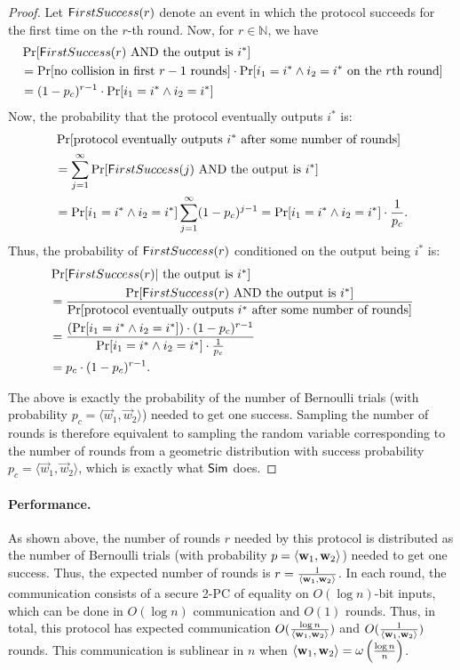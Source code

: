 \begin{proof}
Let ${\sf FirstSuccess}(r)$ denote an event in which the protocol
succeeds for the first time on the $r$-th round.  Now, for $r \in
\mathbb{N}$, we have 
%
\begin{align*}
&\Pr[{\sf FirstSuccess}(r) \mbox{ AND the output is } i^*]\\
&=
\Pr[\mbox{no collision in first } r-1 \mbox{ rounds}] \cdot \Pr[i_1 = i^* \wedge i_2 = i^* \mbox{ on the $r$th round}]\\
&= (1-p_c)^{r-1} \cdot \Pr[i_1 = i^* \wedge i_2 = i^*] 
\end{align*}
%
Now, the probability that the protocol eventually outputs $i^*$ is:
\begin{align*}
&\Pr[\mbox{protocol eventually outputs } i^* \mbox{ after some number of rounds}]\\
&= \sum_{j=1}^\infty \Pr[{\sf FirstSuccess}(j) \mbox{ AND the output is } i^*] \\ &= \Pr[i_1 = i^* \wedge i_2 = i^*]
\sum_{j=1}^\infty (1-p_c)^{j-1}
= \Pr[i_1 = i^* \wedge i_2 = i^*] \cdot \frac{1}{p_c}.
\end{align*}
Thus, the probability of ${\sf FirstSuccess}(r)$ conditioned on the
output being $i^*$ is:
\begin{align*}
&\Pr[{\sf FirstSuccess}(r) | \mbox{ the output is $i^*$}]\\
&= \frac{\Pr[{\sf FirstSuccess}(r) \mbox{ AND the output is }
i^*]}{\Pr[\mbox{protocol eventually outputs } i^* \mbox{ after some number of rounds}]}\\
&= \frac{(\Pr[i_1 = i^* \wedge i_2 = i^*]) \cdot (1-p_c)^{r-1}}{\Pr[i_1
= i^* \wedge i_2 = i^*] \cdot \frac{1}{p_c}}\\
&= p_c \cdot (1-p_c)^{r-1}.
\end{align*}

The above is exactly the probability of the number of Bernoulli trials
(with probability $p_c = \langle \vec{w}_1, \vec{w}_2 \rangle$) needed to
get one success.  Sampling the number of rounds is therefore equivalent
to sampling the random variable corresponding to the number of rounds
from a geometric distribution with success probability $p_c = \langle
\vec{w}_1, \vec{w}_2 \rangle$,
which is exactly what $\Sim$ does. 
\end{proof}

\paragraph{Performance.}
As shown above, the number of rounds $r$ needed by this protocol is
distributed as the number of Bernoulli trials (with probability $p =
\ipw$) needed to get one success.  Thus, the expected number of rounds
is $r=\frac{1}{\ipw}$.  In each round, the communication consists of a
secure 2-PC of equality on $O(\log n)$-bit inputs, which can be done in
$O(\log n)$ communication and $O(1)$ rounds.  Thus, in total, this
protocol has expected communication $O(\frac{\log n}{\ipw})$ and
$O(\frac{1}{\ipw})$ rounds.  This communication is sublinear in $n$ when
$\ipw = \omega\left(\frac{\log n}{n}\right)$.\medskip


